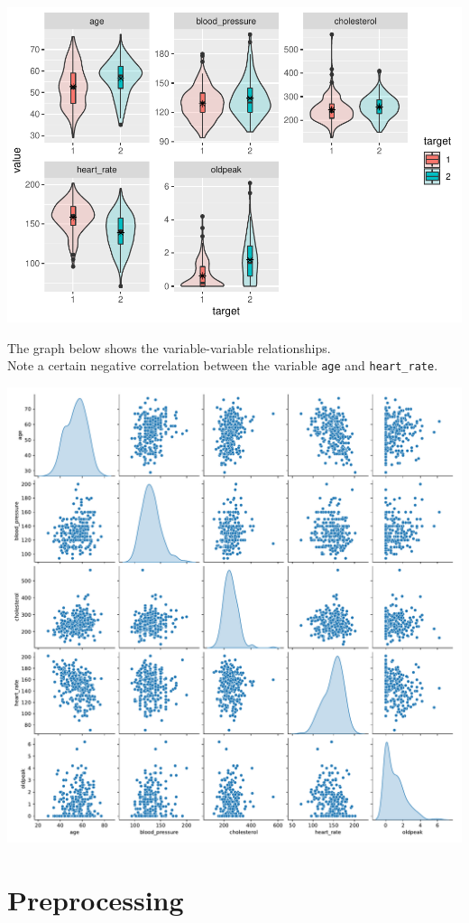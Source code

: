 \documentclass[
]{article}
\begin{document}
\includegraphics{hd_files/figure-latex/unnamed-chunk-17-1.pdf}

\newpage

The graph below shows the variable-variable relationships.\\
Note a certain negative correlation between the variable \texttt{age}
and \texttt{heart\_rate}.

\includegraphics{hd_files/figure-latex/unnamed-chunk-18-1.pdf}

\hypertarget{preprocessing}{%
\section{Preprocessing}\label{preprocessing}}
\end{document}
